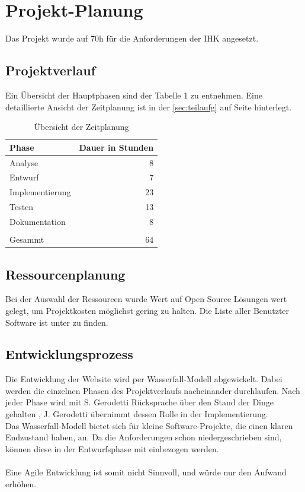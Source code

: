\documentclass[11pt,a4paper]{article}
\begin{document}
\section{Projekt-Planung}
Das Projekt wurde auf 70h für die Anforderungen der IHK angesetzt. 
\subsection{Projektverlauf}
Ein Übersicht der Hauptphasen sind der Tabelle 1 zu entnehmen. Eine detaillierte Ansicht der Zeitplanung ist in der \ref{sec:teilaufg} auf Seite \pageref{sec:teilaufg} hinterlegt.\\
\begin{table}[!ht]
  \centering
     \begin{tabular}{l|r}
       \textbf{Phase}  & \textbf{Dauer in Stunden} \\
       \hline
      Analyse       & 8                     \\
      Entwurf       & 7             	    \\
      Implementierung       & 23	\\
      Testen       & 13			         \\
       Dokumentation      &  8        \\
       \\
       \hline
       \hline
       Gesammt        & 64               \\
     \end{tabular}
     \caption{Übersicht der Zeitplanung}
\label{tbl:Übersicht der Zeitplanung}
\end{table} 
\subsection{Ressourcenplanung}
Bei der Auswahl der Ressourcen wurde Wert auf Open Source Lösungen wert gelegt, um Projektkosten möglichst gering zu halten. Die Liste aller Benutzter Software ist unter %
zu finden.
\subsection{Entwicklungsprozess}
Die Entwicklung der Website wird per Wasserfall-Modell abgewickelt. Dabei werden die einzelnen Phasen des Projektverlaufs nacheinander durchlaufen. Nach jeder Phase wird mit S. Gerodetti Rücksprache über den Stand der Dinge gehalten , J. Gerodetti übernimmt dessen Rolle in der Implementierung.\\
Das Wasserfall-Modell bietet sich für kleine Software-Projekte, die einen klaren Endzustand haben, an. Da die Anforderungen schon niedergeschrieben sind, können diese in der Entwurfsphase mit einbezogen werden. \\\\
Eine Agile Entwicklung ist somit nicht Sinnvoll, und würde nur den Aufwand erhöhen.
\end{document}
